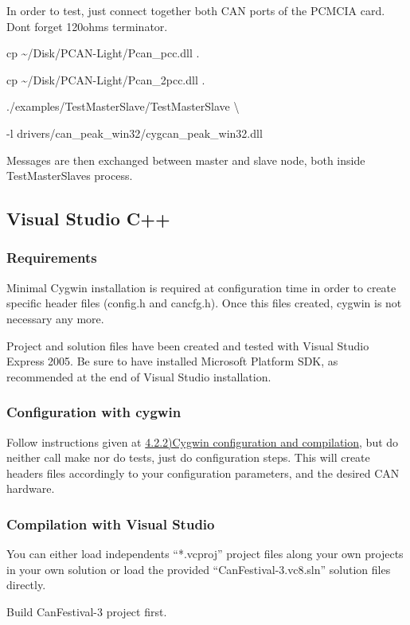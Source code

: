 \documentclass[12pt,twoside]{article}
\begin{document}
In order to test, just connect together both CAN ports of the PCMCIA
card. Don{\textquotesingle}t forget 120ohms terminator.

{\ttfamily
cp \~{}/Disk/PCAN{}-Light/Pcan\_pcc.dll .}

{\ttfamily
cp \~{}/Disk/PCAN{}-Light/Pcan\_2pcc.dll .}

{\ttfamily
./examples/TestMasterSlave/TestMasterSlave {\textbackslash}}

{\ttfamily
  {}-l drivers/can\_peak\_win32/cygcan\_peak\_win32.dll}

Messages are then exchanged between master and slave node, both inside
TestMasterSlave{\textquotesingle}s process.

\subsection{Visual Studio C++}
\subsubsection{Requirements}
Minimal Cygwin installation is required at configuration time in order
to create specific header files (config.h and cancfg.h). Once this
files created, cygwin is not necessary any more.

Project and solution files have been created and tested with Visual
Studio Express 2005. Be sure to have installed Microsoft Platform SDK,
as recommended at the end of Visual Studio installation.

\subsubsection{Configuration with cygwin}
Follow instructions given at
\hyperlink{a422Cygwinconfigurationandcompilationoutline}{4.2.2)Cygwin
configuration and compilation}, but do neither call make nor do tests,
just do configuration steps. This will create headers files accordingly
to your configuration parameters, and the desired CAN hardware.

\subsubsection{Compilation with Visual Studio}
You can either load independents ``*.vcproj'' project files along your
own projects in your own solution or load the provided
``CanFestival{}-3.vc8.sln'' solution files directly.

Build CanFestival{}-3 project first.
\end{document}
